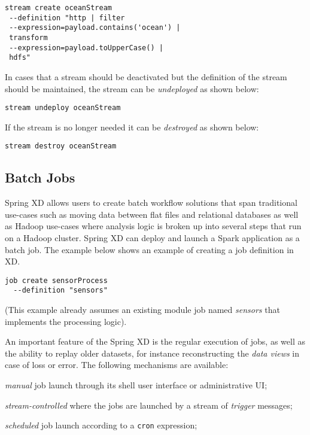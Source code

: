\begin{lstlisting}
stream create oceanStream 
 --definition "http | filter
 --expression=payload.contains('ocean') |
 transform
 --expression=payload.toUpperCase() |
 hdfs"
\end{lstlisting}

In cases that a stream should be deactivated but the definition of the stream
should be maintained, the stream can be \emph{undeployed} as shown below:

\begin{lstlisting}
stream undeploy oceanStream
\end{lstlisting}

If the stream is no longer needed it can be \emph{destroyed} as shown below:

\begin{lstlisting}
stream destroy oceanStream
\end{lstlisting}

\subsection {Batch Jobs}

Spring XD allows users to create batch workflow solutions that span traditional
use-cases such as moving data between flat files and relational databases as
well as Hadoop use-cases where analysis logic is broken up into several steps
that run on a Hadoop cluster. Spring XD can deploy and launch a Spark application
as a batch job.  The example below shows an example of creating a
job definition in XD.

\begin{lstlisting}
job create sensorProcess
  --definition "sensors"
\end{lstlisting}

(This example already assumes an existing module job named \emph{sensors} that
implements the processing logic).

An important feature of the Spring XD is the regular
execution of jobs, as well as the ability to replay older datasets, for
instance reconstructing the \emph{data views} in case of loss or error.
The following mechanisms are available:

\begin{itemize*}
\item \emph{manual} job launch through its shell user interface or
administrative UI;
\item \emph{stream-controlled} where the jobs are launched by a stream of
\emph{trigger} messages;
\item \emph{scheduled} job launch according to a \texttt{cron} expression;
\end{itemize*}


